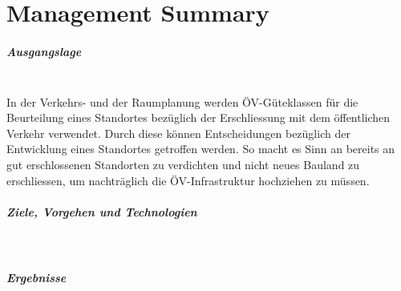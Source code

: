 
\chapter*{Management Summary}

\paragraph{Ausgangslage}~\\
In der Verkehrs- und der Raumplanung werden ÖV-Güteklassen für die Beurteilung eines Standortes bezüglich der Erschliessung mit dem öffentlichen Verkehr verwendet.
Durch diese können Entscheidungen bezüglich der Entwicklung eines Standortes getroffen werden.
So macht es Sinn an bereits an gut erschlossenen Standorten zu verdichten und nicht neues Bauland zu erschliessen, um nachträglich die ÖV-Infrastruktur hochziehen zu müssen.



\paragraph{Ziele, Vorgehen und Technologien}~\\


\paragraph{Ergebnisse}~\\



